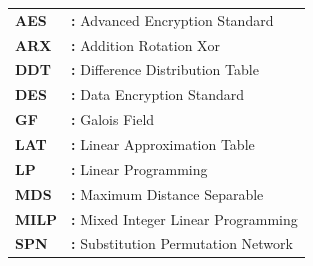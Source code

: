 \hspace{-3mm}
\begin{tabular}{p{2cm}l}
{\bf AES} & {\bf:} Advanced Encryption Standard\\
{\bf ARX} & {\bf:} Addition Rotation Xor\\
{\bf DDT} & {\bf:} Difference Distribution Table\\
{\bf DES} & {\bf:} Data Encryption Standard\\
{\bf GF} & {\bf:} Galois Field\\
{\bf LAT} & {\bf:} Linear Approximation Table\\
{\bf LP} & {\bf:} Linear Programming\\
{\bf MDS} & {\bf:} Maximum Distance Separable\\
{\bf MILP} & {\bf:} Mixed Integer Linear Programming\\
{\bf SPN} & {\bf:} Substitution Permutation Network\\
\end{tabular}

